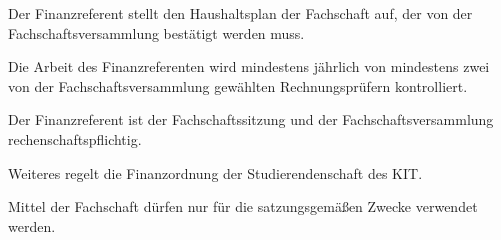 \documentclass[a4paper,parskip=half,numbers=noenddot]{scrartcl}
\begin{document}
\begin{contract}
Der Finanzreferent stellt den Haushaltsplan der Fachschaft auf, der von der Fachschaftsversammlung bestätigt werden muss.

Die Arbeit des Finanzreferenten wird mindestens jährlich von mindestens zwei von der Fachschaftsversammlung gewählten Rechnungsprüfern kontrolliert.

Der Finanzreferent ist der Fachschaftssitzung und der Fachschaftsversammlung rechenschaftspflichtig.

Weiteres regelt die Finanzordnung der Studierendenschaft des KIT.

Mittel der Fachschaft dürfen nur für die satzungsgemäßen Zwecke verwendet werden.



\end{contract}
\end{document}
